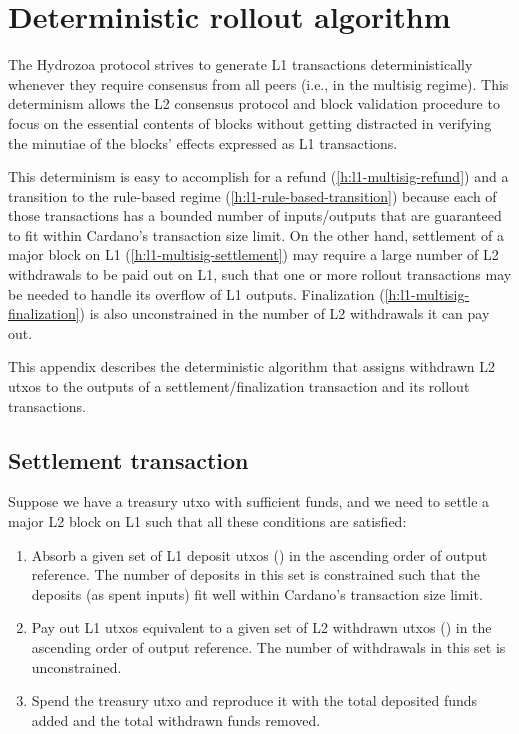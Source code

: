 \documentclass[../hydrozoa.tex]{subfiles}
\begin{document}
\chapter{Deterministic rollout algorithm}%
\label{h:deterministic-rollout-algorithm}%

The Hydrozoa protocol strives to generate L1 transactions deterministically whenever they require consensus from all peers (i.e., in the multisig regime).
This determinism allows the L2 consensus protocol and block validation procedure to focus on the essential contents of blocks without getting distracted in verifying the minutiae of the blocks' effects expressed as L1 transactions.

This determinism is easy to accomplish for a refund (\cref{h:l1-multisig-refund}) and a transition to the rule-based regime (\cref{h:l1-rule-based-transition}) because each of those transactions has a bounded number of inputs/outputs that are guaranteed to fit within Cardano's transaction size limit.
On the other hand, settlement of a major block on L1 (\cref{h:l1-multisig-settlement}) may require a large number of L2 withdrawals to be paid out on L1, such that one or more rollout transactions may be needed to handle its overflow of L1 outputs.
Finalization (\cref{h:l1-multisig-finalization}) is also unconstrained in the number of L2 withdrawals it can pay out.

This appendix describes the deterministic algorithm that assigns withdrawn L2 utxos to the outputs of a settlement/finalization transaction and its rollout transactions.

\section{Settlement transaction}%
\label{h:deterministic-rollout-settlement}%

Suppose we have a treasury utxo with sufficient funds, and we need to settle a major L2 block on L1 such that all these conditions are satisfied:
\begin{enumerate}
  \item Absorb a given set of L1 deposit utxos () in the ascending order of output reference.
    The number of deposits in this set is constrained such that the deposits (as spent inputs) fit well within Cardano's transaction size limit.
  \item Pay out L1 utxos equivalent to a given set of L2 withdrawn utxos () in the ascending order of output reference.
    The number of withdrawals in this set is unconstrained.
  \item Spend the treasury utxo and reproduce it with the total deposited funds added and the total withdrawn funds removed.
\end{enumerate}
\end{document}
